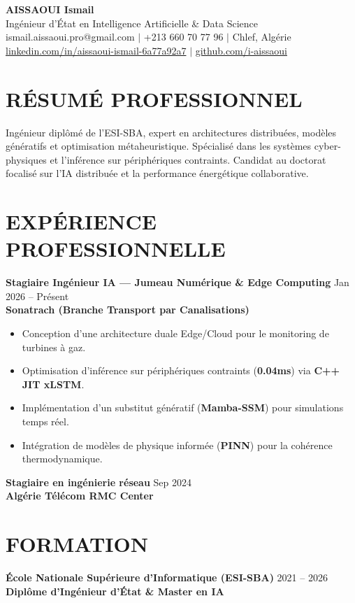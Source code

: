 \documentclass[a4paper,11pt]{article}
\begin{document}
\begin{center}
    {\Huge\bfseries\color{titleblue} AISSAOUI Ismail}\\[4pt]
    {\Large Ingénieur d'État en Intelligence Artificielle \& Data Science}\\[6pt]
    ismail.aissaoui.pro@gmail.com $|$ +213 660 70 77 96 $|$ Chlef, Algérie \\
    \href{https://linkedin.com/in/aissaoui-ismail-6a77a92a7}{linkedin.com/in/aissaoui-ismail-6a77a92a7} $|$ \href{https://github.com/i-aissaoui}{github.com/i-aissaoui}
\end{center}

\section{RÉSUMÉ PROFESSIONNEL}
Ingénieur diplômé de l'ESI-SBA, expert en architectures distribuées, modèles génératifs et optimisation métaheuristique. Spécialisé dans les systèmes cyber-physiques et l'inférence sur périphériques contraints. Candidat au doctorat focalisé sur l'IA distribuée et la performance énergétique collaborative.

\section{EXPÉRIENCE PROFESSIONNELLE}
\textbf{Stagiaire Ingénieur IA — Jumeau Numérique \& Edge Computing} \hfill Jan 2026 -- Présent \\
\textbf{Sonatrach (Branche Transport par Canalisations)} \\
\begin{itemize}
    \item Conception d'une architecture duale Edge/Cloud pour le monitoring de turbines à gaz.
    \item Optimisation d'inférence sur périphériques contraints (\textbf{0.04ms}) via \textbf{C++ JIT xLSTM}.
    \item Implémentation d'un substitut génératif (\textbf{Mamba-SSM}) pour simulations temps réel.
    \item Intégration de modèles de physique informée (\textbf{PINN}) pour la cohérence thermodynamique.
\end{itemize}

\textbf{Stagiaire en ingénierie réseau} \hfill Sep 2024 \\
\textbf{Algérie Télécom RMC Center}

\section{FORMATION}
\textbf{École Nationale Supérieure d’Informatique (ESI-SBA)} \hfill 2021 -- 2026 \\
\textbf{Diplôme d'Ingénieur d'État \& Master en IA}
\end{document}
